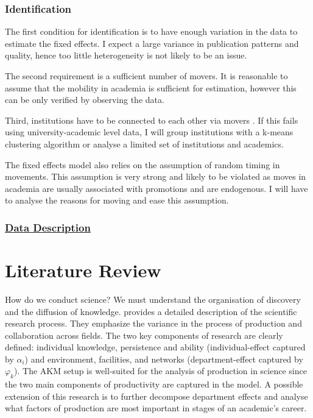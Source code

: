 \documentclass[10pt]{report}
\begin{document}
\subsubsection*{Identification}

The first condition for identification is to have enough variation in the data to estimate the fixed effects. I expect a large variance in publication patterns and quality, hence too little heterogeneity is not likely to be an issue.

The second requirement is a sufficient number of movers. It is reasonable to assume that the mobility in academia is sufficient for estimation, however this can be only verified by observing the data. 

Third, institutions have to be connected to each other via movers \parencite{Abowd2002}. If this fails using university-academic level data, I will group institutions with a k-means clustering algorithm \parencite{Bonhomme2019} or analyse a limited set of institutions and academics.

The fixed effects model also relies on the assumption of random timing in movements. This assumption is very strong and likely to be violated as moves in academia are usually associated with promotions and are endogenous. I will have to analyse the reasons for moving and ease this assumption.

\subsubsection*{\hyperref[ssec:data]{Data Description}}

\newpage
\section*{Literature Review}
\label{sec:lit}

How do we conduct science? We must understand the organisation of discovery and the diffusion of knowledge. \textcite{Stephan2012} provides a detailed description of the scientific research process. They emphasize the variance in the process of production and collaboration across fields. The two key components of research are clearly defined: individual knowledge, persistence and ability (individual-effect captured by \(\alpha_i\)) and environment, facilities, and networks (department-effect captured by \(\varphi_k\)). The AKM setup is well-suited for the analysis of production in science since the two main components of productivity are captured in the model. A possible extension of this research is to further decompose department effects and analyse what factors of production are most important in stages of an academic's career.
\end{document}
